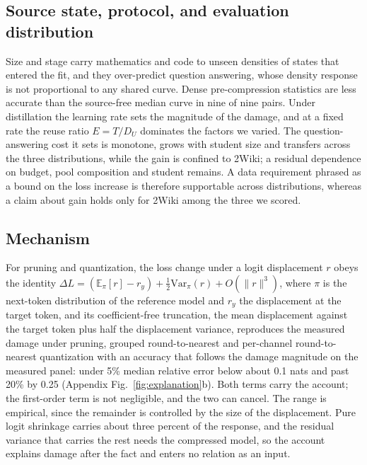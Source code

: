 \subsection{Source state, protocol, and evaluation distribution}
\label{sec:why_conditions}

Size and stage carry mathematics and code to unseen densities of states that entered the fit, and
they over-predict question answering, whose density response is not proportional to any shared
curve. Dense pre-compression statistics are less accurate than the source-free median curve in nine
of nine pairs. Under distillation the learning rate sets the magnitude of the damage, and at a fixed rate the
reuse ratio $E=T/D_U$ dominates the factors we varied. The question-answering cost it sets is
monotone, grows with student size and transfers across the three distributions, while the gain is
confined to 2Wiki; a residual dependence on budget, pool composition and student remains. A data requirement phrased as a bound on the loss increase is therefore supportable across
distributions, whereas a claim about gain holds only for 2Wiki among the three we scored.

\subsection{Mechanism}
\label{sec:why_mech}

For pruning and quantization, the loss change under a logit displacement $r$ obeys the identity
$\Delta L=(\mathbb{E}_{\pi}[r]-r_y)+\tfrac12\mathrm{Var}_{\pi}(r)+O(\lVert r\rVert^3)$, where $\pi$ is
the next-token distribution of the reference model and $r_y$ the displacement at the target token,
and its coefficient-free truncation, the mean displacement against the target token plus half the
displacement variance, reproduces the measured damage under pruning, grouped round-to-nearest and
per-channel round-to-nearest quantization with an accuracy that follows the damage magnitude on the
measured panel: under 5\% median relative error below about 0.1 nats and past 20\% by 0.25
(Appendix Fig.~\ref{fig:explanation}b). Both terms carry the account; the first-order term is not
negligible, and the two can cancel. The range is empirical, since the remainder is controlled by the size of the displacement. Pure logit shrinkage carries about three percent of the response, and the residual variance that
carries the rest needs the compressed model, so the account explains damage after the fact and
enters no relation as an input.
